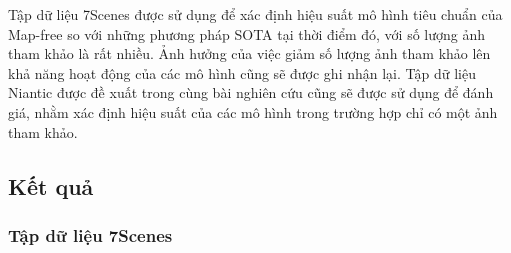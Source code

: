 Tập dữ liệu 7Scenes \cite{6619221} được sử dụng để xác định hiệu suất mô hình tiêu chuẩn của Map-free so với những phương pháp SOTA tại thời điểm đó, với số lượng ảnh tham khảo là rất nhiều. Ảnh hưởng của việc giảm số lượng ảnh tham khảo lên khả năng hoạt động của các mô hình cũng sẽ được ghi nhận lại. Tập dữ liệu Niantic \cite{arnold2022mapfree} được đề xuất trong cùng bài nghiên cứu cũng sẽ được sử dụng để đánh giá, nhằm xác định hiệu suất của các mô hình trong trường hợp chỉ có một ảnh tham khảo.


\subsection{Kết quả}
\subsubsection{Tập dữ liệu 7Scenes}

